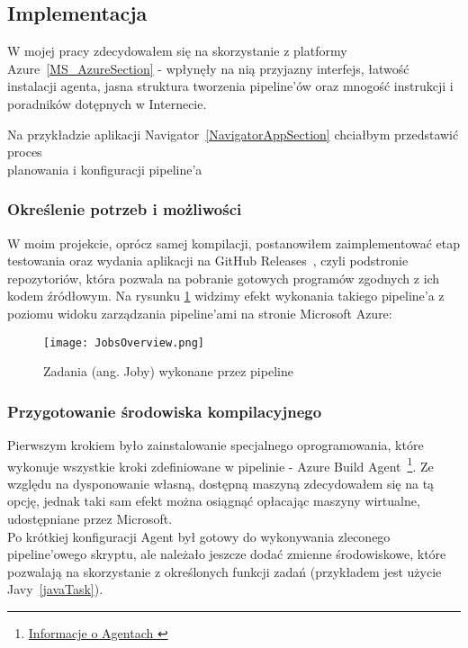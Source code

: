 \subsection{Implementacja}
W mojej pracy zdecydowałem się na skorzystanie z platformy Azure~\ref{MS_AzureSection} - 
wpłynęły na nią przyjazny interfejs, łatwość instalacji agenta, jasna struktura tworzenia pipeline'ów 
oraz mnogość instrukcji i poradników dotępnych w Internecie.

Na przykładzie aplikacji Navigator~\ref{NavigatorAppSection} chciałbym przedstawić proces \\
planowania i konfiguracji pipeline'a \todo{}

\subsubsection{Określenie potrzeb i możliwości}
W moim projekcie, oprócz samej kompilacji, postanowiłem zaimplementować etap testowania 
oraz wydania aplikacji na GitHub Releases~\cite{githubReleases}, czyli podstronie repozytoriów, która 
pozwala na pobranie gotowych programów zgodnych z ich kodem źródłowym.
Na rysunku \ref{img:JobsOverview} widzimy efekt wykonania takiego pipeline'a z poziomu 
widoku zarządzania pipeline'ami na stronie Microsoft Azure:

\begin{figure}[ht]
    \centering
    \texttt{[image: JobsOverview.png]}
    \caption{Zadania (ang. Joby) wykonane przez pipeline}
    \label{img:JobsOverview}
\end{figure}


\subsubsection{Przygotowanie środowiska kompilacyjnego}
Pierwszym krokiem było zainstalowanie specjalnego oprogramowania, 
które wykonuje wszystkie kroki zdefiniowane w pipelinie - Azure Build Agent~\footnote[1]{
    \href{https://learn.microsoft.com/en-us/azure/devops/pipelines/agents/agents}{
        Informacje o Agentach
    }
}.
Ze względu na dysponowanie własną, dostępną maszyną zdecydowałem się na tą opcję,
jednak taki sam efekt można osiągnąć opłacając maszyny wirtualne, udostępniane przez Microsoft. \\%
Po krótkiej konfiguracji Agent był gotowy do 
wykonywania zleconego \\%
pipeline'owego skryptu, ale należało jeszcze dodać zmienne środowiskowe, 
które pozwalają na skorzystanie z określonych funkcji zadań (przykładem jest użycie Javy~\ref{javaTask}).


